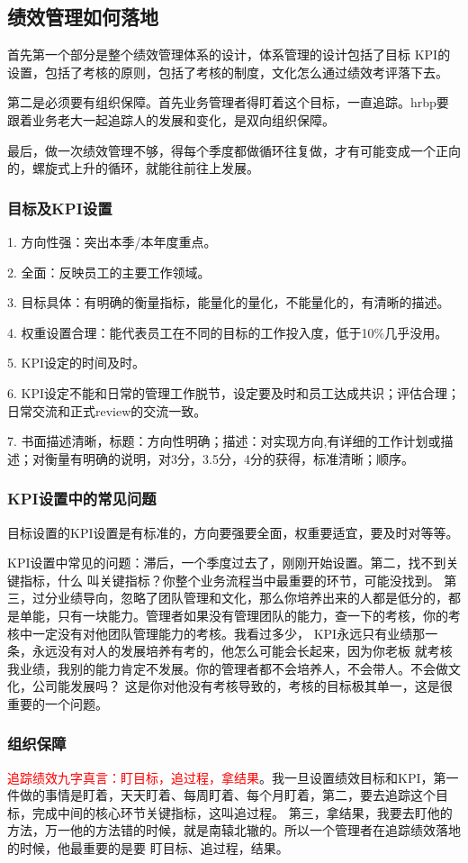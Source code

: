 \documentclass[12pt]{article}
\begin{document}
\subsection{绩效管理如何落地}
首先第一个部分是整个绩效管理体系的设计，体系管理的设计包括了目标 KPI的设置，包括了考核的原则，包括了考核的制度，文化怎么通过绩效考评落下去。

第二是必须要有组织保障。首先业务管理者得盯着这个目标，一直追踪。hrbp要跟着业务老大一起追踪人的发展和变化，是双向组织保障。

最后，做一次绩效管理不够，得每个季度都做循环往复做，才有可能变成一个正向的，螺旋式上升的循环，就能往前往上发展。

\subsubsection{目标及KPI设置}
1. 方向性强：突出本季/本年度重点。

2. 全面：反映员工的主要工作领域。

3. 目标具体：有明确的衡量指标，能量化的量化，不能量化的，有清晰的描述。

4. 权重设置合理：能代表员工在不同的目标的工作投入度，低于10\%几乎没用。

5. KPI设定的时间及时。

6. KPI设定不能和日常的管理工作脱节，设定要及时和员工达成共识；评估合理；日常交流和正式review的交流一致。

7. 书面描述清晰，标题：方向性明确；描述：对实现方向,有详细的工作计划或描述；对衡量有明确的说明，对3分，3.5分，4分的获得，标准清晰；顺序。

\subsubsection{KPI设置中的常见问题}
目标设置的KPI设置是有标准的，方向要强要全面，权重要适宜，要及时对等等。

KPI设置中常见的问题：滞后，一个季度过去了，刚刚开始设置。第二，找不到关键指标，什么 叫关键指标？你整个业务流程当中最重要的环节，可能没找到。 第三，过分业绩导向，忽略了团队管理和文化，那么你培养出来的人都是低分的，都是单能，只有一块能力。管理者如果没有管理团队的能力，查一下的考核，你的考核中一定没有对他团队管理能力的考核。我看过多少， KPI永远只有业绩那一条，永远没有对人的发展培养有考的，他怎么可能会长起来，因为你老板 就考核我业绩，我别的能力肯定不发展。你的管理者都不会培养人，不会带人。不会做文化，公司能发展吗？ 这是你对他没有考核导致的，考核的目标极其单一，这是很重要的一个问题。

\subsubsection{组织保障}
\textcolor{red}{追踪绩效九字真言：盯目标，追过程，拿结果}。我一旦设置绩效目标和KPI，第一件做的事情是盯着，天天盯着、每周盯着、每个月盯着，第二，要去追踪这个目标，完成中间的核心环节关键指标，这叫追过程。 第三，拿结果，我要去盯他的方法，万一他的方法错的时候，就是南辕北辙的。所以一个管理者在追踪绩效落地的时候，他最重要的是要 盯目标、追过程，结果。
\end{document}
